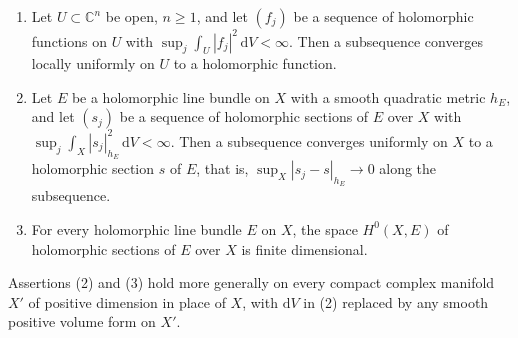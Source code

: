 \begin{lemma}\label{lem:l2-bounded-holomorphic-compactness}
\begin{enumerate}
\item Let $U\subset\mathbb C^n$ be open, $n\geq1$, and let $(f_j)$ be a sequence of holomorphic functions on $U$ with $\sup_j\int_U|f_j|^2\,\mathrm dV<\infty$. Then a subsequence converges locally uniformly on $U$ to a holomorphic function.
\item Let $E$ be a holomorphic line bundle on $X$ with a smooth quadratic metric $h_E$, and let $(s_j)$ be a sequence of holomorphic sections of $E$ over $X$ with $\sup_j\int_X|s_j|_{h_E}^2\,\mathrm dV<\infty$. Then a subsequence converges uniformly on $X$ to a holomorphic section $s$ of $E$, that is, $\sup_X|s_j-s|_{h_E}\to0$ along the subsequence.
\item For every holomorphic line bundle $E$ on $X$, the space $H^0(X,E)$ of holomorphic sections of $E$ over $X$ is finite dimensional.
\end{enumerate}
Assertions (2) and (3) hold more generally on every compact complex manifold $X'$ of positive dimension in place of $X$, with $\mathrm dV$ in (2) replaced by any smooth positive volume form on $X'$.
\end{lemma}
